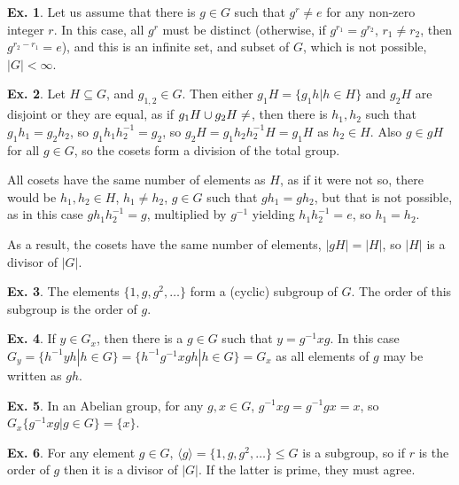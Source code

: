 \documentclass[a4paper,12pt]{article}
\theoremstyle{definition}
\newtheorem{exercise}{Ex.}[section]
\begin{document}
\begin{exercise}
 Let us assume that there is $g\in G$ such that $g^r\ne e$ for any non-zero integer $r$. In this case, all $g^r$ must be distinct (otherwise, if $g^{r_1} = g^{r_2}$, $r_1\ne r_2$, then $g^{r_2-r_1}=e$), and this is an infinite set, and subset of $G$, which is not possible, $|G|<\infty$.
\end{exercise}

\begin{exercise}
 Let $H\subseteq G$, and $g_{1,2}\in G$. Then either $g_1H=\{g_1h|h\in H\}$ and $g_2H$ are disjoint or they are equal, as if $g_1H \cup g_2H \ne\empty$, then there is $h_1, h_2$ such that $g_1 h_1 = g_2 h_2$, so $g_1 h_1 h_2^{-1} = g_2$, so $g_2 H = g_1 h_2 h_2^{-1} H = g_1 H$ as $h_2\in H$. Also $g\in gH$ for all $g\in G$, so the cosets form a division of the total group.
 
 All cosets have the same number of elements as $H$, as if it were not so, there would be $h_1, h_2\in H$, $h_1\ne h_2$, $g\in G$ such that $g h_1 = g h_2$, but that is not possible, as in this case $g h_1 h_2^{-1} = g$, multiplied by $g^{-1}$ yielding $h_1 h_2^{-1}  =e$, so $h_1 = h_2$.
 
 As a result, the cosets have the same number of elements, $|gH| = |H|$, so $|H|$ is a divisor of $|G|$.
\end{exercise}

\begin{exercise}
 The elements $\{1, g, g^2, \dots\}$ form a (cyclic) subgroup of $G$. The order of this subgroup is the order of $g$.
\end{exercise}

\begin{exercise}
 If $y\in G_x$, then there is a $g\in G$ such that $y=g^{-1}xg$. In this case $G_y = \{h^{-1}yh|h\in G\} = \{h^{-1}g^{-1}xgh| h\in G\}=G_x$ as all elements of $g$ may be written as $gh$.
\end{exercise}

\begin{exercise}
 In an Abelian group, for any $g,x\in G$, $g^{-1}xg=g^{-1}gx=x$, so $G_x\{g^{-1}xg| g\in G\} = \{x\}$.
\end{exercise}

\begin{exercise}
 For any element $g\in G$, $\langle g\rangle=\{1,g,g^2,\dots\}\le G$ is a subgroup, so if $r$ is the order of $g$ then it is a divisor of $|G|$. If the latter is prime, they must agree.
\end{exercise}
\end{document}
